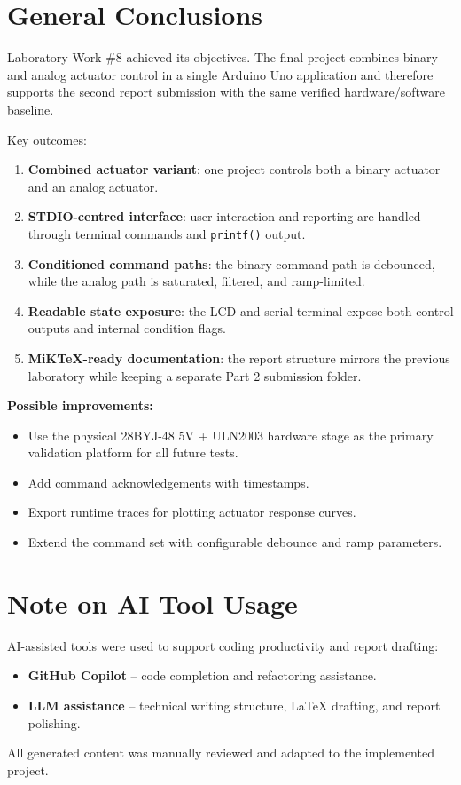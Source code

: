 \documentclass[12pt]{article}
\begin{document}
\section*{General Conclusions}
\hspace{0.8cm} Laboratory Work \#8 achieved its objectives. The final project combines binary and analog actuator control in a single Arduino Uno application and therefore supports the second report submission with the same verified hardware/software baseline.

Key outcomes:
\begin{enumerate}
    \item \textbf{Combined actuator variant}: one project controls both a binary actuator and an analog actuator.
    \item \textbf{STDIO-centred interface}: user interaction and reporting are handled through terminal commands and \texttt{printf()} output.
    \item \textbf{Conditioned command paths}: the binary command path is debounced, while the analog path is saturated, filtered, and ramp-limited.
    \item \textbf{Readable state exposure}: the LCD and serial terminal expose both control outputs and internal condition flags.
    \item \textbf{MiKTeX-ready documentation}: the report structure mirrors the previous laboratory while keeping a separate Part 2 submission folder.
\end{enumerate}

\textbf{Possible improvements:}
\begin{itemize}
    \item Use the physical 28BYJ-48 5V + ULN2003 hardware stage as the primary validation platform for all future tests.
    \item Add command acknowledgements with timestamps.
    \item Export runtime traces for plotting actuator response curves.
    \item Extend the command set with configurable debounce and ramp parameters.
\end{itemize}

\section*{Note on AI Tool Usage}
\hspace{0.8cm} AI-assisted tools were used to support coding productivity and report drafting:
\begin{itemize}
    \item \textbf{GitHub Copilot} -- code completion and refactoring assistance.
    \item \textbf{LLM assistance} -- technical writing structure, LaTeX drafting, and report polishing.
\end{itemize}
All generated content was manually reviewed and adapted to the implemented project.
\end{document}
